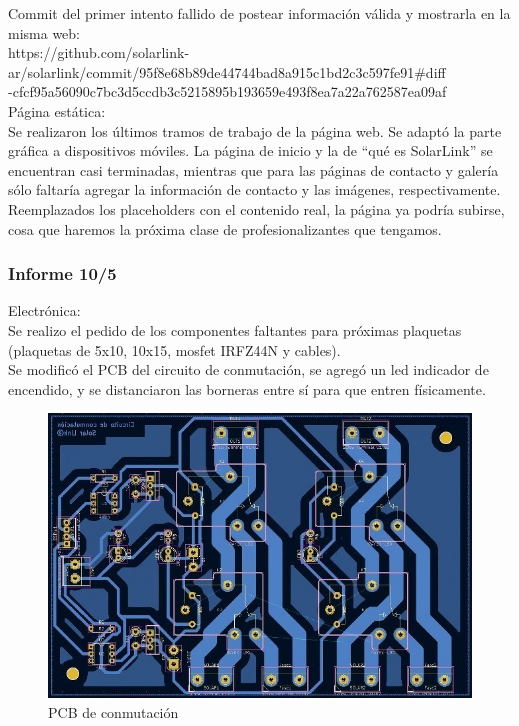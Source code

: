 Commit del primer intento fallido de postear información válida y mostrarla en la misma web:\\
https://github.com/solarlink-\\ar/solarlink/commit/95f8e68b89de44744bad8a915c1bd2c3c597fe91\#diff\\-cfcf95a56090c7bc3d5ccdb3c5215895b193659e493f8ea7a22a762587ea09af\\


Página estática:\\

Se realizaron los últimos tramos de trabajo de la página web. Se adaptó la parte gráfica a dispositivos móviles. La página de inicio y la de “qué es SolarLink” se encuentran casi terminadas, mientras que para las páginas de contacto y galería sólo faltaría agregar la información de contacto y las imágenes, respectivamente. Reemplazados los placeholders con el contenido real, la página ya podría subirse, cosa que haremos la próxima clase de profesionalizantes que tengamos.\\

\subsubsection{Informe 10/5}

Electrónica:\\

Se realizo el pedido de los componentes faltantes para próximas plaquetas (plaquetas de 5x10, 10x15, mosfet IRFZ44N y cables).\\

Se modificó el PCB del circuito de conmutación, se agregó un led indicador de encendido, y se distanciaron las borneras entre sí para que entren físicamente.\\

\begin{figure}[H]
    \centering
    \includegraphics[width=0.75\linewidth]{informes/Screenshot_18.jpg}
    \caption{PCB de conmutación}
\end{figure}

